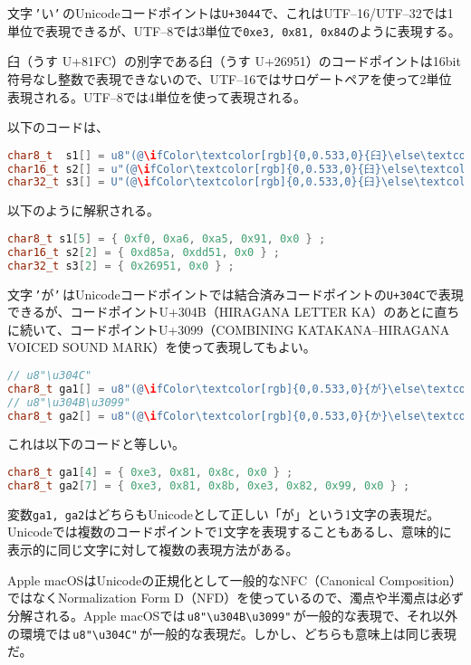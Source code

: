 文字\,\texttt{'}\textsf{い}\texttt{'}\,のUnicodeコードポイントは\texttt{U+3044}で、これはUTF--16/UTF--32では1単位で表現できるが、UTF--8では3単位で\texttt{0xe3, 0x81, 0x84}のように表現する。

臼（うす U+81FC）の別字である𦥑（うす U+26951）のコードポイントは16bit符号なし整数で表現できないので、UTF--16ではサロゲートペアを使って2単位表現される。UTF--8では4単位を使って表現される。

以下のコードは、
\begin{lstlisting}[language={C++}]
char8_t  s1[] = u8"(@\ifColor\textcolor[rgb]{0,0.533,0}{𦥑}\else\textcolor{black}{𦥑}\fi@)" ;
char16_t s2[] = u"(@\ifColor\textcolor[rgb]{0,0.533,0}{𦥑}\else\textcolor{black}{𦥑}\fi@)" ;
char32_t s3[] = U"(@\ifColor\textcolor[rgb]{0,0.533,0}{𦥑}\else\textcolor{black}{𦥑}\fi@)" ;
\end{lstlisting}
以下のように解釈される。
\begin{lstlisting}[language={C++}]
char8_t s1[5] = { 0xf0, 0xa6, 0xa5, 0x91, 0x0 } ;
char16_t s2[2] = { 0xd85a, 0xdd51, 0x0 } ;
char32_t s3[2] = { 0x26951, 0x0 } ;
\end{lstlisting}

文字\,\texttt{'}\textsf{が}\texttt{'}\,はUnicodeコードポイントでは結合済みコードポイントの\texttt{U+304C}で表現できるが、コードポイントU+304B（HIRAGANA LETTER KA）のあとに直ちに続いて、コードポイントU+3099（COMBINING KATAKANA--HIRAGANA VOICED SOUND MARK）を使って表現してもよい。

\begin{lstlisting}[language={C++}]
// u8"\u304C"
char8_t ga1[] = u8"(@\ifColor\textcolor[rgb]{0,0.533,0}{が}\else\textcolor{black}{が}\fi@)" ;
// u8"\u304B\u3099"
char8_t ga2[] = u8"(@\ifColor\textcolor[rgb]{0,0.533,0}{か}\else\textcolor{black}{か}\fi@)\u3099" ;
\end{lstlisting}

これは以下のコードと等しい。

\begin{lstlisting}[language={C++}]
char8_t ga1[4] = { 0xe3, 0x81, 0x8c, 0x0 } ;
char8_t ga2[7] = { 0xe3, 0x81, 0x8b, 0xe3, 0x82, 0x99, 0x0 } ;
\end{lstlisting}

変数\texttt{ga1, ga2}はどちらもUnicodeとして正しい「が」という1文字の表現だ。Unicodeでは複数のコードポイントで1文字を表現することもあるし、意味的に表示的に同じ文字に対して複数の表現方法がある。

Apple macOSはUnicodeの正規化として一般的なNFC（Canonical Composition）ではなくNormalization Form D（NFD）を使っているので、濁点や半濁点は必ず分解される。Apple macOSでは\,\texttt{u8"{\textbackslash}u304B{\textbackslash}u3099"}\,が一般的な表現で、それ以外の環境では\,\texttt{u8"{\textbackslash}u304C"}\,が一般的な表現だ。しかし、どちらも意味上は同じ表現だ。

